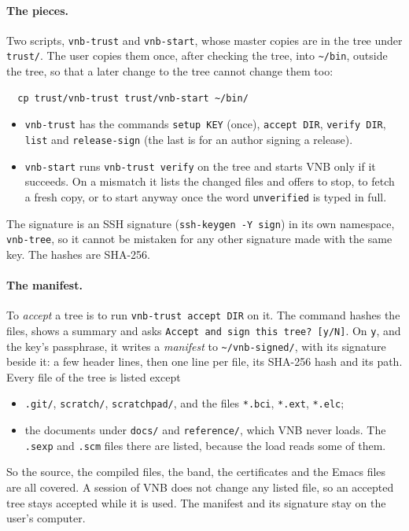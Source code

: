\paragraph{The pieces.}  Two scripts, \texttt{vnb-trust} and
\texttt{vnb-start}, whose master copies are in the tree under
\texttt{trust/}.  The user copies them once, after checking the
tree, into \texttt{\textasciitilde/bin}, outside the tree, so that a
later change to the tree cannot change them too:
\begin{verbatim}
  cp trust/vnb-trust trust/vnb-start ~/bin/
\end{verbatim}
\begin{itemize}
\item \texttt{vnb-trust} has the commands \texttt{setup KEY} (once),
  \texttt{accept DIR}, \texttt{verify DIR}, \texttt{list} and
  \texttt{release-sign} (the last is for an author signing a
  release).
\item \texttt{vnb-start} runs \texttt{vnb-trust verify} on the tree and
  starts VNB only if it succeeds.  On a mismatch it lists the changed
  files and offers to stop, to fetch a fresh copy, or to start anyway
  once the word \texttt{unverified} is typed in full.
\end{itemize}
The signature is an SSH signature (\texttt{ssh-keygen -Y sign}) in its
own namespace, \texttt{vnb-tree}, so it cannot be mistaken for any
other signature made with the same key.  The hashes are SHA-256.

\paragraph{The manifest.}  To \emph{accept} a tree is to run
\texttt{vnb-trust accept DIR} on it.  The command hashes the files,
shows a summary and asks \texttt{Accept and sign this tree? [y/N]}.  On
\texttt{y}, and the key's passphrase, it writes a \emph{manifest} to
\texttt{\textasciitilde/vnb-signed/}, with its signature beside it: a
few header lines, then one line per file, its SHA-256 hash and its
path.  Every file of the tree is
listed except
\begin{itemize}
\item \texttt{.git/}, \texttt{scratch/}, \texttt{scratchpad/}, and the
  files \texttt{*.bci}, \texttt{*.ext}, \texttt{*.elc};
\item the documents under \texttt{docs/} and \texttt{reference/}, which
  VNB never loads.  The \texttt{.sexp} and \texttt{.scm} files there are
  listed, because the load reads some of them.
\end{itemize}
So the source, the compiled files, the band, the certificates and the
Emacs files are all covered.  A session of VNB does not change any
listed file, so an accepted tree stays accepted while it is used.  The
manifest and its signature stay on the user's computer.

